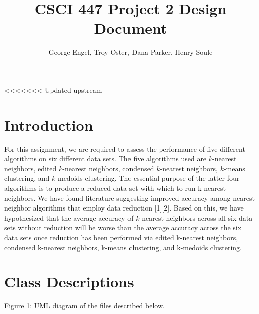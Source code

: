 \documentclass{article}
\title{CSCI 447 Project 2 Design Document}
\author{George Engel, Troy Oster, Dana Parker, Henry Soule}
\begin{document}
\maketitle
<<<<<<< Updated upstream

\section{Introduction} %
For this assignment, we are required to assess the performance of five different algorithms on six different data sets. The five algorithms used are $k$-nearest neighbors, edited $k$-nearest neighbors, condensed $k$-nearest neighbors, $k$-means clustering, and $k$-medoids clustering.  The essential purpose of the latter four algorithms is to produce a reduced data set with which to run k-nearest neighbors. We have found literature suggesting improved accuracy among nearest neighbor algorithms that employ data reduction [1][2].  Based on this, we have hypothesized that the average accuracy of $k$-nearest neighbors across all six data sets without reduction will be worse than the average accuracy across the six data sets once reduction has been performed via edited k-nearest neighbors, condensed k-nearest neighbors, k-means clustering, and k-medoids clustering.

\section{Class Descriptions}

\begin{center}
    \caption{\label{test} Figure 1: UML diagram of the files described below.}
\end{center}
\end{document}
